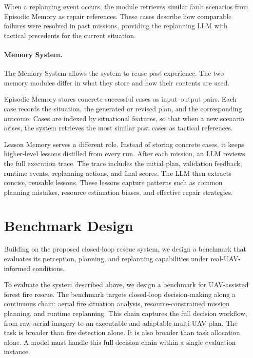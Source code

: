 When a replanning event occurs, the module retrieves similar fault scenarios
from Episodic Memory as repair references.
These cases describe how comparable failures were resolved in past missions,
providing the replanning LLM with tactical precedents for the current situation.

\paragraph{Memory System.} The Memory System allows the system to reuse past experience.
The two memory modules differ in what they store and how their contents are used.

Episodic Memory stores concrete successful cases as input--output pairs.
Each case records the situation, the generated or revised plan,
and the corresponding outcome.
Cases are indexed by situational features, so that when a new scenario arises,
the system retrieves the most similar past cases as tactical references.

Lesson Memory serves a different role. Instead of storing concrete cases,
it keeps higher-level lessons distilled from every run.
After each mission, an LLM reviews the full execution trace.
The trace includes the initial plan, validation feedback, runtime events,
replanning actions, and final scores.
The LLM then extracts concise, reusable lessons.
These lessons capture patterns such as common planning mistakes, resource estimation biases,
and effective repair strategies.

\section{Benchmark Design}

Building on the proposed closed-loop rescue system, we design a benchmark that
evaluates its perception, planning, and replanning capabilities under
real-UAV-informed conditions.

To evaluate the system described above, we design a benchmark for
UAV-assisted forest fire rescue.
The benchmark targets closed-loop decision-making along a continuous chain:
aerial fire situation analysis,
resource-constrained mission planning, and runtime replanning.
This chain captures the full decision workflow, from raw aerial imagery
to an executable and adaptable multi-UAV plan.
The task is broader than fire detection alone.
It is also broader than task allocation alone.
A model must handle this full decision chain within a single
evaluation instance.

